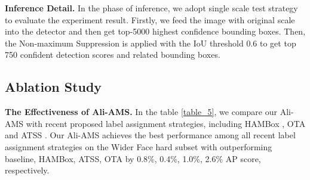\documentclass[10pt,twocolumn,letterpaper]{article}
\begin{document}
 \noindent\textbf{Inference Detail.}
In the phase of inference, we adopt single scale test strategy to evaluate the experiment result. Firstly, we feed the image with original scale into the detector and then get top-5000 highest confidence bounding boxes. Then, the Non-maximum Suppression is applied with the IoU threshold 0.6 to get top 750 confident detection scores and related bounding boxes. 
\subsection{Ablation Study}
\noindent\textbf{The Effectiveness of Ali-AMS.} In the table \ref{table_5}, we 
compare our Ali-AMS with recent proposed label assignment strategies, including HAMBox \cite{liu2019hambox}, OTA \cite{ge2021ota} and ATSS \cite{zhang2020bridging}.  Our Ali-AMS achieves the best performance among all recent label assignment strategies on the Wider Face hard subset with outperforming baseline, HAMBox, ATSS, OTA by 0.8\%, 0.4\%, 1.0\%, 2.6\% AP score, respectively.
\end{document}
